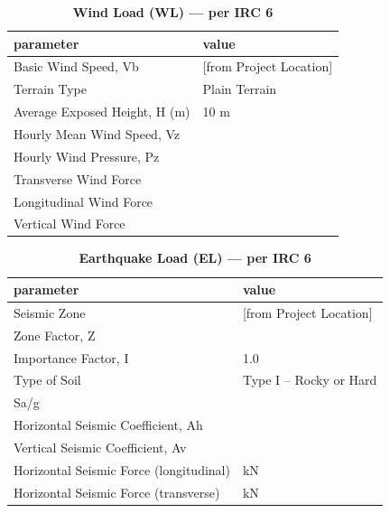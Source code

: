 \documentclass[12pt,a4paper]{report}
\numberwithin{table}{chapter}
\numberwithin{figure}{chapter}
\begin{document}
\vspace{1em}
\begin{longtable}{|L{5.5cm}|p{10.0cm}|}
\caption{\textbf{Wind Load (WL) --- per IRC 6}}
\\
\hline
\textbf{parameter} & \textbf{value} \\
\hline
\textnormal{Basic Wind Speed, Vb} &  [from Project Location] \\[6pt]
\hline
\textnormal{Terrain Type} & Plain Terrain \\[6pt]
\hline
\textnormal{Average Exposed Height, H (m)} & 10 m \\[6pt]
\hline
\textnormal{Hourly Mean Wind Speed, Vz} &  \\[6pt]
\hline
\textnormal{Hourly Wind Pressure, Pz} &  \\[6pt]
\hline
\textnormal{Transverse Wind Force} &  \\[6pt]
\hline
\textnormal{Longitudinal Wind Force} &  \\[6pt]
\hline
\textnormal{Vertical Wind Force} &  \\[6pt]
\hline
\end{longtable}

\vspace{1em}
\begin{longtable}{|L{5.5cm}|p{10.0cm}|}
\caption{\textbf{Earthquake Load (EL) --- per IRC 6}}
\\
\hline
\textbf{parameter} & \textbf{value} \\
\hline
\textnormal{Seismic Zone} &  [from Project Location] \\[6pt]
\hline
\textnormal{Zone Factor, Z} &  \\[6pt]
\hline
\textnormal{Importance Factor, I} & 1.0 \\[6pt]
\hline
\textnormal{Type of Soil} & Type I – Rocky or Hard \\[6pt]
\hline
\textnormal{Sa/g} &  \\[6pt]
\hline
\textnormal{Horizontal Seismic Coefficient, Ah} &  \\[6pt]
\hline
\textnormal{Vertical Seismic Coefficient, Av} &  \\[6pt]
\hline
\textnormal{Horizontal Seismic Force (longitudinal)} &  kN \\[6pt]
\hline
\textnormal{Horizontal Seismic Force (transverse)} &  kN \\[6pt]
\hline
\end{longtable}
\end{document}
